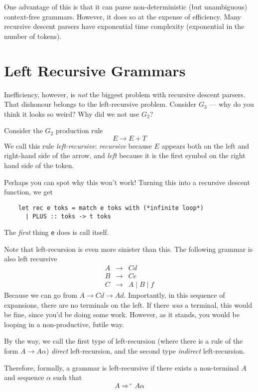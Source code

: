 One advantage of this is that it can parse non-deterministic (but unambiguous) context-free grammars. However, it does so at the expense of efficiency. Many recursive descent parsers have exponential time complexity (exponential in the number of tokens).

\section{Left Recursive Grammars}
Inefficiency, however, is \textit{not} the biggest problem with recursive descent parsers. That dishonour belongs to the left-recursive problem. Consider $G_3$ --- why do you think it looks so weird? Why did we not use $G_2$?

Consider the $G_2$ production rule
\[ E \rightarrow E + T \]
We call this rule \textit{left-recursive}: \textit{recursive} because $E$ appears both on the left and right-hand side of the arrow, and \textit{left} because it is the first symbol on the right hand side of the token.

Perhaps you can spot why this won't work! Turning this into a recursive descent function, we get 
\begin{verbatim}
    let rec e toks = match e toks with (*infinite loop*)
      | PLUS :: toks -> t toks
\end{verbatim}

The \textit{first} thing \texttt{e} does is call itself. 

Note that left-recursion is even more sinister than this. The following grammar is also left recursive
\[\begin{array}{lcl}
     A & \rightarrow & Cd  \\
     B & \rightarrow & Ce \\
     C & \rightarrow & A \mid B \mid f
\end{array}\]
Because we can go from $A \rightarrow Cd \rightarrow Ad$. Importantly, in this sequence of expansions, there are no terminals on the left. If there \textit{was} a terminal, this would be fine, since you'd be doing some work. However, as it stands, you would be looping in a non-productive, futile way.

By the way, we call the first type of left-recursion (where there is a rule of the form $A \rightarrow A\alpha$) \textit{direct} left-recursion, and the second type \textit{indirect} left-recursion.

Therefore, formally, a grammar is left-recursive if there exists a non-terminal $A$ and sequence $\alpha$ such that
\[ A \Rightarrow^{+} A\alpha \]

